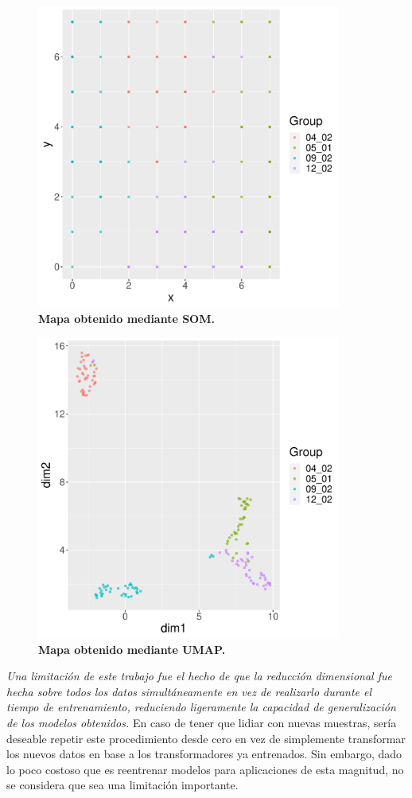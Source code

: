 \documentclass[12pt]{article}
\begin{document}
\begin{figure}[htbp]
    \centering
    \includegraphics[width=10cm]{SOM.pdf}
    \caption{\textbf{Mapa obtenido mediante SOM.}}
    \label{fig:SOM}
\end{figure}

\begin{figure}[htbp]
    \centering
    \includegraphics[width=10cm]{UMAP.pdf}
    \caption{\textbf{Mapa obtenido mediante UMAP.}}
    \label{fig:UMAP}
\end{figure}

\textit{Una limitación de este trabajo fue el hecho de que la reducción dimensional fue hecha sobre todos los datos simultáneamente en vez de realizarlo durante el tiempo de entrenamiento, reduciendo ligeramente la capacidad de generalización de los modelos obtenidos.} En caso de tener que lidiar con nuevas muestras, sería deseable repetir este procedimiento desde cero en vez de simplemente transformar los nuevos datos en base a los transformadores ya entrenados. Sin embargo, dado lo poco costoso que es reentrenar modelos para aplicaciones de esta magnitud, no se considera que sea una limitación importante.
\end{document}
